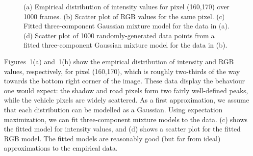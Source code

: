 \begin{figure}[t]
\caption{(a) Empirical distribution of intensity values for pixel (160,170)
over 1000 frames. (b) Scatter plot of RGB values for the same pixel.
(c) Fitted three-component Gaussian mixture model for the data in (a).
(d) Scatter plot of 1000 randomly-generated data points from a fitted
three-component Gaussian mixture model for the data in (b).}
\label{pixel-model-figure}
\end{figure}

Figures~\ref{pixel-model-figure}(a) and~\ref{pixel-model-figure}(b)
show the empirical distribution of intensity and RGB values,
respectively, for pixel (160,170), which is roughly two-thirds of the
way towards the bottom right corner of the image.  These data display
the behaviour one would expect: the shadow and road pixels form two
fairly well-defined peaks, while the vehicle pixels are widely
scattered.  As a first approximation, we assume that each distribution
can be modelled as a Gaussian.  Using expectation maximization, we can fit three-component mixture models to the
data. (c) shows the fitted model for
intensity values, and (d) shows a scatter
plot for the fitted RGB model. The fitted models are reasonably good
(but far from ideal) approximations to the empirical data.

